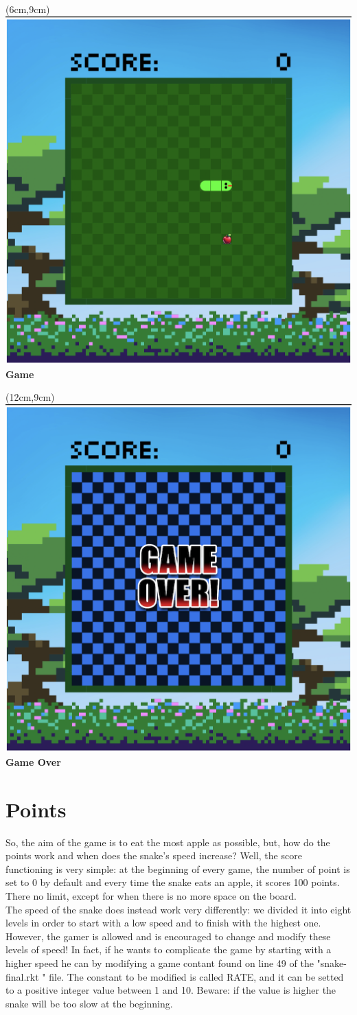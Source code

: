 \documentclass{article}
\begin{document}
	\begin{textblock*}{10cm}(6cm,9cm)
		\centering
		\includegraphics[width=.5\linewidth]{game.png}\\
		\Large{\textbf{Game}}
	\end{textblock*}
	
	\begin{textblock*}{10cm}(12cm,9cm)
		\centering
		\includegraphics[width=.5\linewidth]{game-over.png}\\
		\Large{\textbf{Game Over}}
	\end{textblock*}
	
	\vspace{6.5cm}\section{Points}
	So, the aim of the game is to eat the most apple as possible, but, how do the points work and when does the snake's speed increase? Well, the score functioning is very simple: at the beginning of every game, the number of point is set to 0 by default and every time the snake eats an apple, it scores 100 points. There no limit, except for when there is no more space on the board.\\
	The speed of the snake does instead work very differently: we divided it into eight levels in order to start with a low speed and to finish with the highest one. However, the gamer is allowed and is encouraged to change and modify these levels of speed! In fact, if he wants to complicate the game by starting with a higher speed he can by modifying a game contant found on line 49 of the "snake-final.rkt " file. The constant to be modified is called RATE, and it can be setted to a positive integer value between 1 and 10. Beware: if the value is higher the snake will be too slow at the beginning.
	
\end{document}
